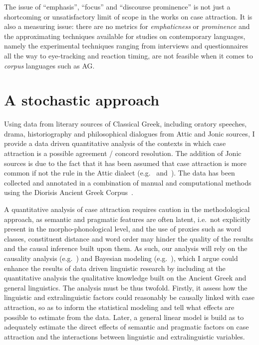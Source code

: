 \documentclass[a4paper, 12pt, article]{memoir}
\begin{document}
The issue of ``emphasis'', ``focus'' and ``discourse prominence'' is not just a
shortcoming or unsatisfactory limit of scope in the works on case attraction.
It is also a measuring issue: there are no metrics for \emph{emphaticness} or
\emph{prominence} and the approximating techniques available for studies on
contemporary languages, namely the experimental techniques ranging from
interviews and questionnaires all the way to eye-tracking and reaction timing,
are not feasible when it comes to \emph{corpus} languages such as AG\@.




\chapter{A stochastic approach} %

Using data from literary sources of Classical Greek, including oratory speeches,
drama, historiography and philosophical dialogues from Attic and Jonic sources,
I provide a data driven quantitative analysis of the contexts in which case
attraction is a possible agreement \slash{} concord resolution. The addition of
Jonic sources is due to the fact that it has been assumed that case attraction is
more common if not the rule in the Attic dialect
(e.g.~\cite[\emph{passim.}]{Buttmann1826} and~\cite[\emph{ad loc.}]{Cooper1997}).
The data has been collected and annotated in a combination of manual and
computational methods using the Diorisis Ancient Greek
Corpus~\parencite{TheDiorisisAncientGreekCorpus}.

A quantitative analysis of case attraction requires caution in the
methodological approach, as semantic and pragmatic features are often latent,
i.e.\ not explicitly present in the morpho-phonological level, and the use of
proxies such as word classes, constituent distance and word order may hinder the
quality of the results and the causal inference built upon them.
As such, our analysis will rely on the causality analysis (e.g.~\cite{Pearl2009})
and Bayesian modeling (e.g.~\cite{McElreath2020}), which I argue could
enhance the results of data driven linguistic research by including at the
quantitative analysis the qualitative knowledge built on the Ancient Greek
and general linguistics.
The analysis must be thus twofold. Firstly, it assess how the linguistic and
extralinguistic factors could reasonably be causally linked with case
attraction, so as to inform the statistical modeling and tell what effects are
possible to estimate from the data.
Later, a general linear model is build as to adequately estimate the direct
effects of semantic and pragmatic factors on case attraction and the
interactions between linguistic and extralinguistic variables.
\end{document}
